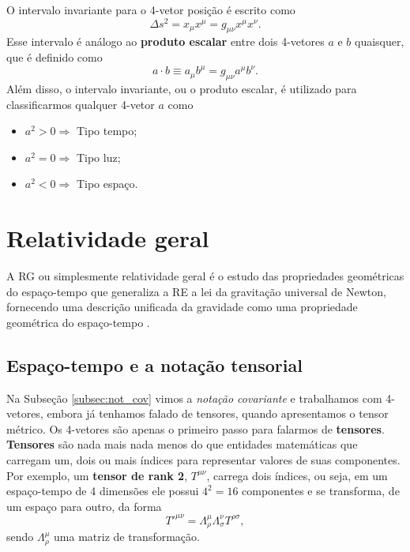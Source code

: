 \documentclass[12pt,a4paper,titlepage,brazil]{article}
\begin{document}
O intervalo invariante para o 4-vetor posição é escrito como
\begin{equation}
 \Delta s^2 = x_{\mu} x^{\mu} = g_{\mu \nu} x^{\mu} x^{\nu} .
\end{equation}
Esse intervalo é análogo ao {\bf produto escalar} entre dois 4-vetores $a$ e $b$ quaisquer, que é definido como
\begin{equation}
 a \cdot b \equiv a_{\mu} b^{\mu} = g_{\mu \nu} a^{\mu} b^{\nu} .
\end{equation}
Além disso, o intervalo invariante, ou o produto escalar, é utilizado para classificarmos qualquer 4-vetor $a$ como
\begin{itemize}
 \item $a^2 > 0 \Rightarrow$ Tipo tempo;
 \item $a^2 = 0 \Rightarrow$ Tipo luz;
 \item $a^2 < 0 \Rightarrow$ Tipo espaço.
\end{itemize}
  

\section{Relatividade geral}

A RG ou simplesmente relatividade geral é o estudo das propriedades geométricas do espaço-tempo que generaliza a RE a lei da gravitação universal de Newton, fornecendo uma descrição unificada da gravidade como uma propriedade geométrica do espaço-tempo \cite{nightingale2006, carroll2004, hartle2003, wald2010}.


\subsection{Espaço-tempo e a notação tensorial}

Na Subseção \ref{subsec:not_cov} vimos a {\em notação covariante} e trabalhamos com 4-vetores, embora já tenhamos falado de tensores, quando apresentamos o tensor métrico. Os 4-vetores são apenas o primeiro passo para falarmos de {\bf tensores}. {\bf Tensores} são nada mais nada menos do que entidades matemáticas que carregam um, dois ou mais índices para representar valores de suas componentes. Por exemplo, um {\bf tensor de rank 2}, $T^{\mu \nu}$, carrega dois índices, ou seja, em um espaço-tempo de 4 dimensões ele possui $4^2 = 16$ componentes e se transforma, de um espaço para outro, da forma
\begin{equation}
 T'^{\mu \nu} = \Lambda^{\mu}_{\rho} \Lambda^{\nu}_{\sigma} T^{\rho \sigma} ,
\end{equation}
sendo $\Lambda^{\mu}_{\rho}$ uma matriz de transformação.
\end{document}

